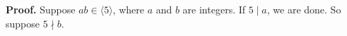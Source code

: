 \documentclass[9pt]{article}
\newcommand{\cyc}[1]{\langle #1 \rangle}
\begin{document}
\begin{enumerate}
      \textbf{Proof.} Suppose $ab \in \cyc{5}$, where $a$ and $b$ are integers.
      If $5 \mid a$, we are done. So suppose $5 \nmid b$.
\end{enumerate}
\end{document}
